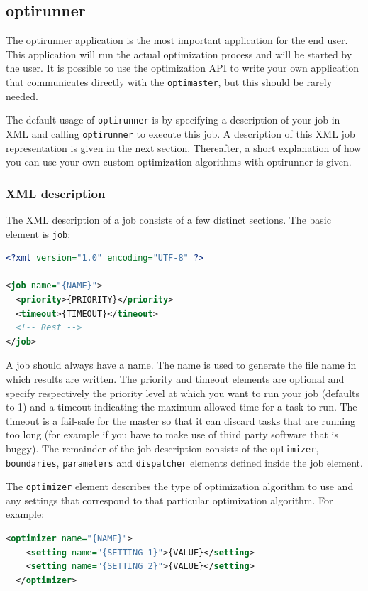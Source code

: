 \documentclass{article}
\begin{document}
\subsection{optirunner}\label{app:optirunner}
The optirunner application is the most important application for the end user.
This application will run the actual optimization process and will be started
by the user. It is possible to use the optimization API to write your own
application that communicates directly with the \verb!optimaster!, but this
should be rarely needed.

The default usage of \verb!optirunner! is by specifying a description of your job
in XML and calling \verb!optirunner! to execute this job. A description of
this XML job representation is given in the next section. Thereafter, a short
explanation of how you can use your own custom optimization algorithms with
optirunner is given.

\subsubsection{XML description}
The XML description of a job consists of a few distinct sections. The basic
element is \verb!job!:

\begin{lstlisting}[language=xml]
<?xml version="1.0" encoding="UTF-8" ?>

<job name="{NAME}">
  <priority>{PRIORITY}</priority>
  <timeout>{TIMEOUT}</timeout>
  <!-- Rest -->
</job>
\end{lstlisting}

A job should always have a name. The name is used to generate the file name
in which results are written. The priority and timeout elements are optional
and specify respectively the priority level at which you want to run your job
(defaults to 1) and a timeout indicating the maximum allowed time for a task
to run. The timeout is a fail-safe for the master so that it can discard tasks
that are running too long (for example if you have to make use of third party
software that is buggy). The remainder of the job description consists of
the \verb!optimizer!, \verb!boundaries!, \verb!parameters! and \verb!dispatcher!
elements defined inside the job element.

The \verb!optimizer! element describes the type of optimization algorithm to
use and any settings that correspond to that particular optimization algorithm.
For example:

\begin{lstlisting}[language=xml]
  <optimizer name="{NAME}">
    <setting name="{SETTING 1}">{VALUE}</setting>
    <setting name="{SETTING 2}">{VALUE}</setting>
  </optimizer>
\end{lstlisting}
\end{document}
